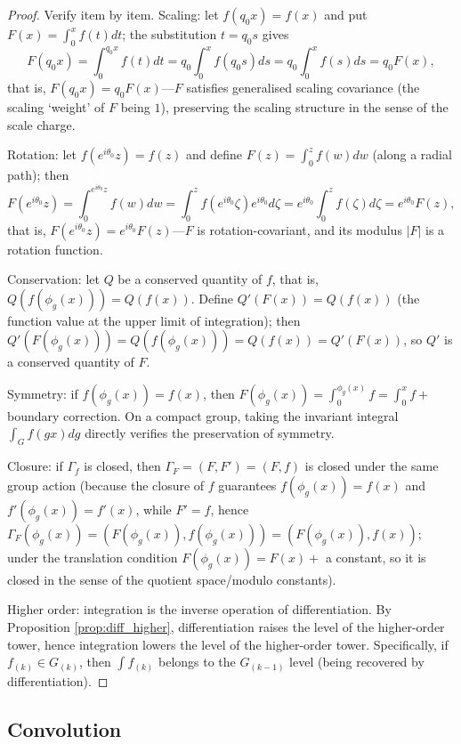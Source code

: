 \begin{proof}
Verify item by item. Scaling: let $f(q_0x)=f(x)$ and put $F(x)=\int_0^x f(t)dt$; the substitution $t=q_0s$ gives
\[
F(q_0x)=\int_0^{q_0x}f(t)dt=q_0\int_0^x f(q_0s)ds=q_0\int_0^x f(s)ds=q_0F(x),
\]
that is, $F(q_0x)=q_0F(x)$---$F$ satisfies generalised scaling covariance (the scaling `weight' of $F$ being $1$), preserving the scaling structure in the sense of the scale charge.

Rotation: let $f(e^{i\theta_0}z)=f(z)$ and define $F(z)=\int_0^z f(w)dw$ (along a radial path); then
\[
F(e^{i\theta_0}z)=\int_0^{e^{i\theta_0}z}f(w)dw=\int_0^z f(e^{i\theta_0}\zeta)e^{i\theta_0}d\zeta=e^{i\theta_0}\int_0^z f(\zeta)d\zeta=e^{i\theta_0}F(z),
\]
that is, $F(e^{i\theta_0}z)=e^{i\theta_0}F(z)$---$F$ is rotation-covariant, and its modulus $|F|$ is a rotation function.

Conservation: let $Q$ be a conserved quantity of $f$, that is, $Q(f(\phi_g(x)))=Q(f(x))$. Define $Q'(F(x))=Q(f(x))$ (the function value at the upper limit of integration); then $Q'(F(\phi_g(x)))=Q(f(\phi_g(x)))=Q(f(x))=Q'(F(x))$, so $Q'$ is a conserved quantity of $F$.

Symmetry: if $f(\phi_g(x))=f(x)$, then $F(\phi_g(x))=\int_0^{\phi_g(x)}f=\int_0^x f+$ boundary correction. On a compact group, taking the invariant integral $\int_G f(gx)dg$ directly verifies the preservation of symmetry.

Closure: if $\Gamma_f$ is closed, then $\Gamma_F=(F,F')=(F,f)$ is closed under the same group action (because the closure of $f$ guarantees $f(\phi_g(x))=f(x)$ and $f'(\phi_g(x))=f'(x)$, while $F' = f$, hence $\Gamma_F(\phi_g(x))=(F(\phi_g(x)),f(\phi_g(x)))=(F(\phi_g(x)),f(x))$; under the translation condition $F(\phi_g(x))=F(x)+$ a constant, so it is closed in the sense of the quotient space/modulo constants).

Higher order: integration is the inverse operation of differentiation. By Proposition \ref{prop:diff_higher}, differentiation raises the level of the higher-order tower, hence integration lowers the level of the higher-order tower. Specifically, if $f_{(k)}\in G_{(k)}$, then $\int f_{(k)}$ belongs to the $G_{(k-1)}$ level (being recovered by differentiation).
\end{proof}

\subsection{Convolution}

